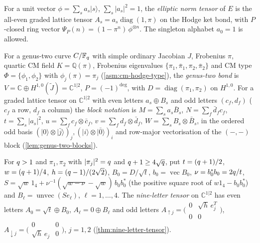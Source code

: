 \begin{definition}
\label{def:elliptic-norm-tensor}
For a unit vector $\phi = \sum_s a_s|s\rangle$, $\sum_s|a_s|^2 = 1$, the \emph{elliptic norm
tensor} of $E$ is the all-even graded lattice tensor $A_s = a_s\operatorname{diag}(1,\pi)$ on the
Hodge ket bond, with $P$-closed ring vector $\Psi_P(n) = (1-\pi^n)\,\phi^{\otimes n}$. The
singleton alphabet $a_0 = 1$ is allowed.
\end{definition}

\begin{definition}
\label{def:genus-two-bond}
For a genus-two curve $C/\mathbb F_q$ with simple ordinary Jacobian $J$, Frobenius $\pi$, quartic CM
field $K = \mathbb Q(\pi)$, Frobenius eigenvalues $\{\pi_1,\bar\pi_1,\pi_2,\bar\pi_2\}$ and CM type
$\Phi = \{\phi_1,\phi_2\}$ with $\phi_j(\pi) = \pi_j$ (\cref{asm:cm-hodge-type}), the %
\emph{genus-two bond} is $V = \mathbb C\oplus H^{1,0}(\tilde J) = \mathbb C^{1|2}$, $P = (-1)^{\deg}$,
with $D = \operatorname{diag}(\pi_1,\pi_2)$ on $H^{1,0}$. For a graded lattice tensor on
$\mathbb C^{1|2}$ with even letters $a_s\oplus B_s$ and odd letters $(c_f, d_f)$ ($c_f$ a row,
$d_f$ a column) the \emph{block notation} is $M = \sum_s a_s\bar B_s$, $N = \sum_f\bar d_fc_f$,
$t = \sum_s|a_s|^2$, $u = \sum_fc_f\otimes\bar c_f$, $v = \sum_fd_f\otimes\bar d_f$,
$W = \sum_sB_s\otimes\bar B_s$, in the ordered odd basis $(|0\rangle\otimes|\bar j\rangle)_j,
(|i\rangle\otimes|\bar0\rangle)_i$ and row-major vectorisation of the $(-,-)$ block
(\cref{lem:genus-two-blocks}).
\end{definition}

\begin{definition}
\label{def:nine-letter-tensor}
For $q>1$ and $\pi_1,\pi_2$ with $|\pi_j|^2 = q$ and $q+1\ge4\sqrt{q}$, put
$t = (q+1)/2$, $w = (q+1)/4$, $h = (q-1)/(2\sqrt2)$, $B_0 = D/\sqrt t$, $b_0 = \operatorname{vec}B_0$,
$\nu = b_0^*b_0 = 2q/t$, $S = \sqrt w\,1_4 + \nu^{-1}(\sqrt{w-\nu}-\sqrt w)\,b_0b_0^*$ (the positive
square root of $w1_4 - b_0b_0^*$) and $B_\ell = \operatorname{unvec}(Se_\ell)$, $\ell = 1,\dots,4$. The %
\emph{nine-letter tensor} on $\mathbb C^{1|2}$ has even letters $A_0 = \sqrt t\oplus B_0$,
$A_\ell = 0\oplus B_\ell$ and odd letters $A_{\uparrow j} = \bigl(\begin{smallmatrix}0&\sqrt h\,e_j^T\\0&0\end{smallmatrix}\bigr)$, %
$A_{\downarrow j} = \bigl(\begin{smallmatrix}0&0\\ \sqrt h\,e_j&0\end{smallmatrix}\bigr)$, $j = 1,2$
(\cref{thm:nine-letter-tensor}).
\end{definition}
